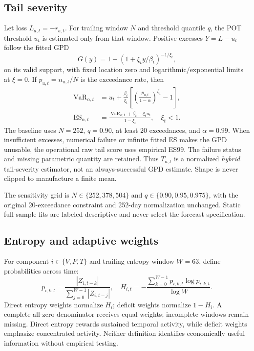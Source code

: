 \documentclass[11pt]{article}
\begin{document}
\subsection{Tail severity}
Let loss $L_{a,t}=-r_{a,t}$. For trailing window $N$ and threshold quantile $q$, the POT threshold
$u_t$ is estimated only from that window. Positive excesses $Y=L-u_t$ follow the fitted GPD
\begin{equation}
G(y)=1-\left(1+\xi_t y/\beta_t\right)^{-1/\xi_t},
\end{equation}
on its valid support, with fixed location zero and logarithmic/exponential limits at $\xi=0$.
If $p_{u,t}=n_{u,t}/N$ is the exceedance rate, then
\begin{align}
\operatorname{VaR}_{\alpha,t}
 &=u_t+\frac{\beta_t}{\xi_t}
 \left[\left(\frac{p_{u,t}}{1-\alpha}\right)^{\xi_t}-1\right],\\
\operatorname{ES}_{\alpha,t}
 &=\frac{\operatorname{VaR}_{\alpha,t}+\beta_t-\xi_tu_t}{1-\xi_t},\quad \xi_t<1.
\end{align}
The baseline uses $N=252$, $q=0.90$, at least 20 exceedances, and $\alpha=0.99$.
When insufficient excesses, numerical failure or infinite fitted ES makes the GPD unusable,
the operational raw tail score uses empirical ES99. The failure status and missing parametric
quantity are retained. Thus $T_{a,t}$ is a normalized \emph{hybrid} tail-severity estimator,
not an always-successful GPD estimate. Shape is never clipped to manufacture a finite mean.

The sensitivity grid is $N\in\{252,378,504\}$ and $q\in\{0.90,0.95,0.975\}$, with the original
20-exceedance constraint and 252-day normalization unchanged. Static full-sample fits are labeled
descriptive and never select the forecast specification.

\subsection{Entropy and adaptive weights}
For component $i\in\{V,P,T\}$ and trailing entropy window $W=63$, define probabilities across time:
\begin{equation}
p_{i,k,t}=\frac{|Z_{i,t-k}|}{\sum_{j=0}^{W-1}|Z_{i,t-j}|},\quad
H_{i,t}=-\frac{\sum_{k=0}^{W-1}p_{i,k,t}\log p_{i,k,t}}{\log W}.
\end{equation}
Direct entropy weights normalize $H_i$; deficit weights normalize $1-H_i$. A complete all-zero
denominator receives equal weights; incomplete windows remain missing. Direct entropy rewards
sustained temporal activity, while deficit weights emphasize concentrated activity. Neither definition
identifies economically useful information without empirical testing.
\end{document}
